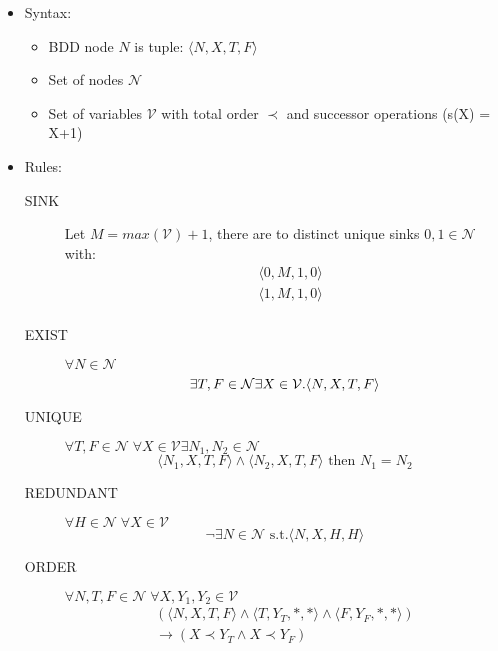 \documentclass[10pt,twocolumn]{article}
\begin{document}
\begin{definition}
\begin{itemize}
\item Syntax: 
   \begin{itemize}
    \item BDD node $N$ is tuple: $\langle N,X,T,F \rangle$ 
    \item Set of nodes $\mathcal{N}$
    \item Set of variables $\mathcal{V}$ with total order $\prec$ and successor operations (s(X) = X+1) 
    \end{itemize}
\item Rules: 
    \begin{description} 
        \item[SINK] Let $M = max(\mathcal{V})+1$, there are to distinct unique sinks $0,1 \in \mathcal{N}$ with:
            \begin{align*}
            & \langle 0,M,1,0 \rangle \\
            & \langle 1,M,1,0 \rangle \\
            \end{align*}
        \item[EXIST] $\forall N \in \mathcal{N}$
            \[
            \exists T,F \in \mathcal{N}  \exists X \in \mathcal{V}. \langle N,X,T,F \rangle \\  
            \]
        \item[UNIQUE] $\forall T,F \in \mathcal{N} \;  \forall X \in \mathcal{V} \exists N_1,N_2 \in \mathcal{N}$
            \[
            \langle N_1,X,T,F \rangle \wedge \langle N_2,X,T,F \rangle \text{ then } N_1 = N_2
            \]
        \item[REDUNDANT] $\forall H \in \mathcal{N} \;  \forall X \in \mathcal{V}$
            \[
             \neg \exists N \in \mathcal{N} \text{ s.t.} \langle N,X,H,H \rangle 
            \]
        \item[ORDER] $\forall N,T,F \in \mathcal{N} \;  \forall X,Y_1,Y_2 \in \mathcal{V} $
            \begin{align*}
            (\langle N,X,T,F \rangle \wedge \langle T,Y_T,\ast,\ast \rangle \wedge \langle F,Y_F,\ast,\ast \rangle)\\
             \rightarrow (X \prec Y_T \wedge X \prec Y_F)
            \end{align*}       

\end{description}
\end{itemize}
\end{definition}
\end{document}
